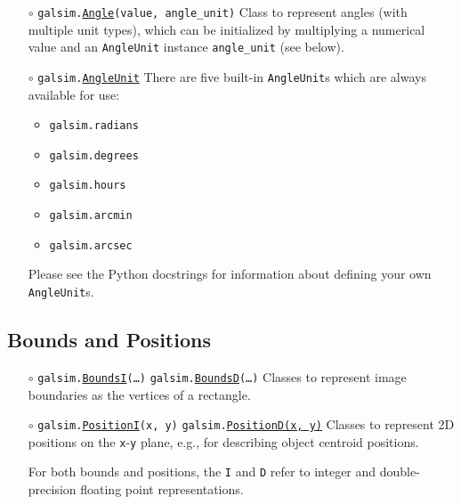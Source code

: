 \documentclass[preprint,10pt]{../../devel/modules/aastex}
\begin{document}
\begin{itemize}

  \item[$\circ$]
  \texttt{galsim.\href{http://galsim-developers.github.io/GalSim/classgalsim_1_1_angle.html}{Angle}(value, angle\_unit)}
    \newline
    Class to represent angles (with multiple unit types),
    which can be initialized by multiplying a numerical
    value and an \texttt{AngleUnit} instance \texttt{angle\_unit} (see
    below).

  \item[$\circ$]
  \texttt{galsim.\href{http://galsim-developers.github.io/GalSim/classgalsim_1_1_angle_unit.html}{AngleUnit}}
    \newline
    There are five built-in \texttt{AngleUnit}s which are
    always available for use:
    \begin{itemize}
      \item \texttt{galsim.radians}
      \item \texttt{galsim.degrees}
      \item \texttt{galsim.hours}
      \item \texttt{galsim.arcmin}
      \item \texttt{galsim.arcsec}
    \end{itemize}
    Please see the Python docstrings for information about defining your
    own \texttt{AngleUnit}s.

\end{itemize}

\subsection{Bounds and Positions}\label{sect:bounds}

\begin{itemize}

  \item[$\circ$]
  \texttt{galsim.\href{http://galsim-developers.github.io/GalSim/classgalsim_1_1_bounds.html}{BoundsI}(\dots)}
    \newline
    \texttt{galsim.\href{http://galsim-developers.github.io/GalSim/classgalsim_1_1_bounds.html}{BoundsD}(\dots)}
    \newline
    Classes to represent image boundaries as the vertices of a rectangle.

  \item[$\circ$]
  \texttt{galsim.\href{http://galsim-developers.github.io/GalSim/classgalsim_1_1_position.html}{PositionI}(x, y)}
    \newline
    \texttt{galsim.\href{http://galsim-developers.github.io/GalSim/classgalsim_1_1_position.html}{PositionD(x, y)}}
    \newline
    Classes to represent
    2D positions on the \texttt{x}-\texttt{y} plane, e.g., for describing object centroid
    positions.

For both bounds and positions, the \texttt{I} and \texttt{D} refer to
integer and double-precision floating point representations.

\end{itemize}
\end{document}
